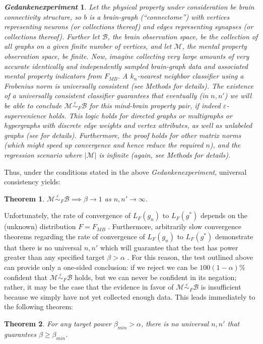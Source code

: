 \documentclass{article}
\providecommand{\tr}[1]{\textcolor{red}{#1}}
\newtheorem{thm}{Theorem}
\providecommand{\mc}[1]{\mathcal{#1}}
\newcommand{\conv}{\rightarrow}
\newcommand{\mB}{\mathcal{B}}
\newcommand{\mM}{\mathcal{M}}
\newcommand{\MeB}{\mM \overset{\varepsilon}{{\sim}}_{F} \mB}
\newtheorem{thex}{\emph{Gedankenexperiment}}
\begin{document}
\begin{thex} \label{exp:1}
Let the physical property under consideration be brain connectivity structure, so $b$ is a brain-graph (``connectome'') with vertices representing neurons (or collections thereof) and edges representing synapses (or collections thereof). Further let $\mB$, the brain observation space, be the collection of all graphs on a given finite number of vertices, and let $\mc{M}$, the mental property observation space, be finite. Now, imagine collecting very large amounts of very accurate identically and independently sampled  brain-graph data and associated mental property indicators from $F_{MB}$. A $k_n$-nearest neighbor classifier using a Frobenius norm is universally consistent (see Methods for details). 
The existence of a universally consistent classifier guarantees that eventually (in $n,n'$) we will be able to conclude $\MeB$ for this mind-brain property pair, if indeed $\varepsilon$-supervenience holds. This logic holds for directed graphs or multigraphs or hypergraphs with discrete edge weights and vertex attributes, as well as unlabeled graphs (see \cite{VP11_unlabeled} for details). Furthermore, the proof holds for other matrix norms (which might speed up convergence and hence reduce the required $n$), and the regression scenario where $|\mM|$ is infinite (again, see Methods for details).  
\end{thex}
Thus, under the conditions stated in the above \emph{Gedankenexperiment}, universal consistency yields:
\begin{thm} \label{thm:3}
	$\MeB \implies \beta \conv 1$ as $n,n'\conv \infty$.
\end{thm}


Unfortunately, the rate of convergence of $L_{F}(g_n)$ to $L_{F}(g^*)$ depends on the (unknown) distribution $F=F_{MB}$ \cite{DGL96}. Furthermore, arbitrarily slow convergence theorems regarding the rate of convergence of $L_{F}(g_n)$ to $L_{F}(g^*)$ demonstrate that there is no universal $n,n'$ which will guarantee that the test has power greater than any specified target $\beta > \alpha$ \cite{Devroye83}. For this reason, the test outlined above can provide only a one-sided conclusion: if we reject we can be $100(1-\alpha)$\% confident that $\MeB$ holds, but we can never be confident in its negation; rather, it may be the case that the evidence in favor of $\MeB$ is insufficient 
because we simply have not yet collected enough data. 
This leads immediately to the following theorem:
\begin{thm} \label{thm:4}
For any target power $\beta_{min} > \alpha$, there is no universal $n,n'$ that guarantees $\beta \geq \beta_{min}$.
\end{thm}
\end{document}
